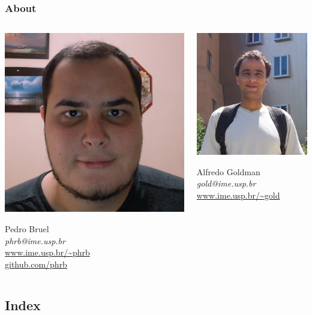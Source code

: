 \documentclass[10pt, compress, aspectratio=169]{beamer}
\begin{document}
\begin{frame}
    \frametitle{About}
    \begin{columns}[T,onlytextwidth]
        \begin{center}
            \includegraphics[width=.45\textwidth]{pedro}

            Pedro Bruel \\
            \emph{\alert{phrb}@ime.usp.br} \\[.3cm]
            \url{www.ime.usp.br/~phrb} \\
            \url{github.com/phrb} \\
        \end{center}

        \begin{center}
            \includegraphics[width=.4\textwidth]{alfredo}

            Alfredo Goldman \\
            \emph{\alert{gold}@ime.usp.br} \\[.3cm]
            \url{www.ime.usp.br/~gold} \\
        \end{center}
    \end{columns}
\end{frame}

\subsection{Index}
\end{document}
